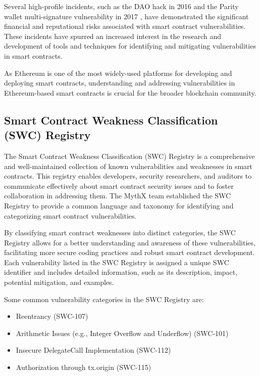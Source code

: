 Several high-profile incidents, such as the DAO hack in 2016 and the Parity wallet multi-signature vulnerability in 2017 \cite{smartcon-vulnerabilities}, have demonstrated the significant financial and reputational risks associated with smart contract vulnerabilities. These incidents have spurred an increased interest in the research and development of tools and techniques for identifying and mitigating vulnerabilities in smart contracts.

As Ethereum is one of the most widely-used platforms for developing and deploying smart contracts, understanding and addressing vulnerabilities in Ethereum-based smart contracts is crucial for the broader blockchain community. 

\subsection{Smart Contract Weakness Classification (SWC) Registry}

The Smart Contract Weakness Classification (SWC) Registry \cite{swc} is a comprehensive and well-maintained collection of known vulnerabilities and weaknesses in smart contracts. This registry enables developers, security researchers, and auditors to communicate effectively about smart contract security issues and to foster collaboration in addressing them. The MythX team established the SWC Registry to provide a common language and taxonomy for identifying and categorizing smart contract vulnerabilities.

By classifying smart contract weaknesses into distinct categories, the SWC Registry allows for a better understanding and awareness of these vulnerabilities, facilitating more secure coding practices and robust smart contract development. Each vulnerability listed in the SWC Registry is assigned a unique SWC identifier and includes detailed information, such as its description, impact, potential mitigation, and examples.

Some common vulnerability categories in the SWC Registry are:

\begin{itemize}
\item Reentrancy (SWC-107)
\item Arithmetic Issues (e.g., Integer Overflow and Underflow) (SWC-101)
\item Insecure DelegateCall Implementation (SWC-112)
\item Authorization through tx.origin (SWC-115)
\end{itemize}

